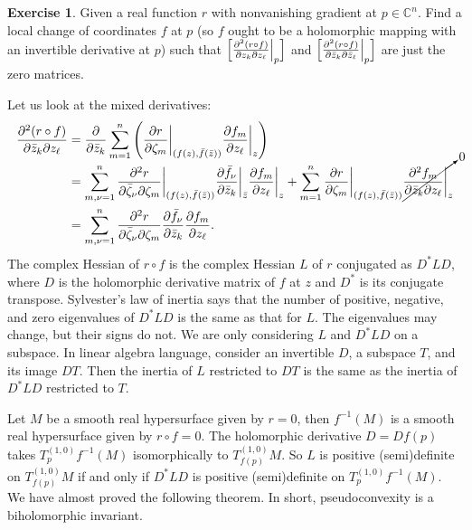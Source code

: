 \documentclass[12pt,openany]{book}
\newcommand{\C}{{\mathbb{C}}}
\theoremstyle{plain}
\theoremstyle{remark}
\theoremstyle{definition}
\newenvironment{exbox}{%
    \def\FrameCommand{\vrule width 1pt \relax\hspace{10pt}}%
    \MakeFramed{\advance\hsize-\width\FrameRestore}%
}{%
    \endMakeFramed
}
\theoremstyle{exercise}
\newtheorem{exercise}{Exercise}[section]
\theoremstyle{example}
\begin{document}
\begin{exbox}
\begin{exercise}
Given a real function $r$ with nonvanishing gradient at $p \in \C^n$.  Find
a local change of coordinates $f$ at $p$ (so $f$ ought to be a holomorphic
mapping with an invertible derivative at $p$) such that
$\Bigl[ \frac{\partial^2 (r \circ f)}{\partial z_k \partial z_\ell} \Big|_p
\Bigr]$
and
$\Bigl[ \frac{\partial^2 (r \circ f)}{\partial \bar{z}_k \partial \bar{z}_\ell}
\Big|_p \Bigr]$
are just the zero matrices.
\end{exercise}
\end{exbox}

Let us look at the mixed derivatives:
\begin{equation*}
\begin{split}
\frac{\partial^2 (r \circ f)}{\partial \bar{z}_k \partial z_\ell}
& =
\frac{\partial}{\partial \bar{z}_k }
\sum_{m=1}^n
\left(
\frac{\partial r}{\partial \zeta_m} \bigg|_{(f(z),\bar{f}(\bar{z}))}
\frac{\partial f_m}{\partial z_\ell} \bigg|_z
\right)
\\
& =
\sum_{m,\nu=1}^n
\frac{\partial^2 r}{\partial \bar{\zeta}_\nu \partial \zeta_m }
\bigg|_{(f(z),\bar{f}(\bar{z}))}
\frac{\partial \bar{f}_\nu}{\partial \bar{z}_k} \bigg|_{\bar{z}}
\frac{\partial f_m}{\partial z_\ell} \bigg|_z
+
\sum_{m=1}^n
\frac{\partial r}{\partial \zeta_m} \bigg|_{(f(z),\bar{f}(\bar{z}))}
\smash{\cancelto{0}{\frac{\partial^2 f_m}{\partial \bar{z}_k \partial
z_\ell} \bigg|_z}}
\\
&=
\sum_{m,\nu=1}^n
\frac{\partial^2 r}{\partial \bar{\zeta}_\nu \partial \zeta_m}
\frac{\partial \bar{f}_\nu}{\partial \bar{z}_k}
\frac{\partial f_m}{\partial z_\ell} .
\end{split}
\end{equation*}
The complex Hessian of $r \circ f$ is the complex Hessian $L$ of $r$
conjugated as $D^*LD$, where $D$ is the holomorphic
derivative matrix of $f$ at $z$ and
$D^*$ is its conjugate transpose.  Sylvester's law of inertia
says that the number of positive, negative, and zero
eigenvalues of $D^*LD$ is the same as that for $L$.  The
eigenvalues may change, but their signs do not.
We are only considering $L$ and $D^*LD$ on a subspace.  In linear algebra
language, consider an invertible $D$, a subspace $T$, and its image $DT$.
Then the inertia of $L$ restricted to $DT$ is the same
as the inertia of $D^*LD$ restricted to $T$.

Let $M$ be a smooth real hypersurface given by $r=0$, then $f^{-1}(M)$ is
a smooth real hypersurface given by $r \circ f = 0$.
The holomorphic derivative $D = Df(p)$
takes
$T_{p}^{(1,0)}f^{-1}(M)$ isomorphically to $T_{f(p)}^{(1,0)}M$.
So $L$ is positive (semi)definite
on $T_{f(p)}^{(1,0)}M$ if and only if $D^*LD$ is positive (semi)definite
on $T_{p}^{(1,0)} f^{-1}(M)$.
We have almost proved the following theorem.  In short, pseudoconvexity is a
biholomorphic invariant.
\end{document}
